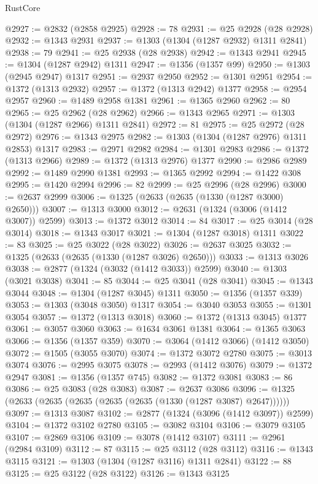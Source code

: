 \begin{lexlean}{RustCore}
\begin{coremodule}
@2927 := @2832 (@2858 @2925)
@2928 := 78
@2931 := @25 @2928 (@28 @2928)
@2932 := @1343 @2931
@2937 := @1303 (@1304 (@1287 @2932) @1311 @2841)
@2938 := 79
@2941 := @25 @2938 (@28 @2938)
@2942 := @1343 @2941
@2945 := @1304 (@1287 @2942) @1311
@2947 := @1356 (@1357 @99)
@2950 := @1303 (@2945 @2947) @1317
@2951 := @2937 @2950
@2952 := @1301 @2951
@2954 := @1372 (@1313 @2932)
@2957 := @1372 (@1313 @2942) @1377
@2958 := @2954 @2957
@2960 := @1489 @2958 @1381
@2961 := @1365 @2960
@2962 := 80
@2965 := @25 @2962 (@28 @2962)
@2966 := @1343 @2965
@2971 := @1303 (@1304 (@1287 @2966) @1311 @2841)
@2972 := 81
@2975 := @25 @2972 (@28 @2972)
@2976 := @1343 @2975
@2982 := @1303 (@1304 (@1287 @2976) @1311 @2853) @1317
@2983 := @2971 @2982
@2984 := @1301 @2983
@2986 := @1372 (@1313 @2966)
@2989 := @1372 (@1313 @2976) @1377
@2990 := @2986 @2989
@2992 := @1489 @2990 @1381
@2993 := @1365 @2992
@2994 := @1422 @308
@2995 := @1420 @2994
@2996 := 82
@2999 := @25 @2996 (@28 @2996)
@3000 := @2637 @2999
@3006 := @1325 (@2633 (@2635 (@1330 (@1287 @3000) @2650)))
@3007 := @1313 @3000
@3012 := @2631 (@1324 (@3006 (@1412 @3007)) @2599)
@3013 := @1372 @3012
@3014 := 84
@3017 := @25 @3014 (@28 @3014)
@3018 := @1343 @3017
@3021 := @1304 (@1287 @3018) @1311
@3022 := 83
@3025 := @25 @3022 (@28 @3022)
@3026 := @2637 @3025
@3032 := @1325 (@2633 (@2635 (@1330 (@1287 @3026) @2650)))
@3033 := @1313 @3026
@3038 := @2877 (@1324 (@3032 (@1412 @3033)) @2599)
@3040 := @1303 (@3021 @3038)
@3041 := 85
@3044 := @25 @3041 (@28 @3041)
@3045 := @1343 @3044
@3048 := @1304 (@1287 @3045) @1311
@3050 := @1356 (@1357 @339)
@3053 := @1303 (@3048 @3050) @1317
@3054 := @3040 @3053
@3055 := @1301 @3054
@3057 := @1372 (@1313 @3018)
@3060 := @1372 (@1313 @3045) @1377
@3061 := @3057 @3060
@3063 := @1634 @3061 @1381
@3064 := @1365 @3063
@3066 := @1356 (@1357 @359)
@3070 := @3064 (@1412 @3066) (@1412 @3050)
@3072 := @1505 (@3055 @3070)
@3074 := @1372 @3072 @2780
@3075 := @3013 @3074
@3076 := @2995 @3075
@3078 := @2993 (@1412 @3076)
@3079 := @1372 @2947
@3081 := @1356 (@1357 @745)
@3082 := @1372 @3081
@3083 := 86
@3086 := @25 @3083 (@28 @3083)
@3087 := @2637 @3086
@3096 := @1325 (@2633 (@2635 (@2635 (@2635 (@2635 (@1330 (@1287 @3087) @2647))))))
@3097 := @1313 @3087
@3102 := @2877 (@1324 (@3096 (@1412 @3097)) @2599)
@3104 := @1372 @3102 @2780
@3105 := @3082 @3104
@3106 := @3079 @3105
@3107 := @2869 @3106
@3109 := @3078 (@1412 @3107)
@3111 := @2961 (@2984 @3109)
@3112 := 87
@3115 := @25 @3112 (@28 @3112)
@3116 := @1343 @3115
@3121 := @1303 (@1304 (@1287 @3116) @1311 @2841)
@3122 := 88
@3125 := @25 @3122 (@28 @3122)
@3126 := @1343 @3125

\end{coremodule}
\end{lexlean}
